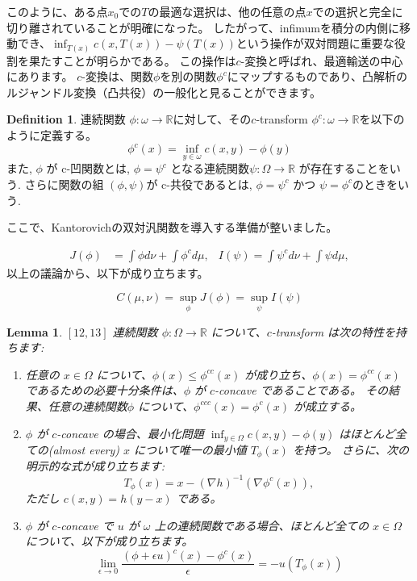 \documentclass{jsarticle}
\newtheorem{lem}[thm]{Lemma}
\theoremstyle{definition}
\newtheorem{dfn}{Definition}[section]
\begin{document}
このように、ある点$x_0$での$T$の最適な選択は、他の任意の点$x$での選択と完全に切り離されていることが明確になった。
したがって、infimumを積分の内側に移動でき、$\inf_{T(x)} c(x,T(x)) - \psi (T(x))$という操作が双対問題に重要な役割を果たすことが明らかである。
この操作は$c$-変換と呼ばれ、最適輸送の中心にあります。
$c$-変換は、関数$\phi$を別の関数$\phi^c$にマップするものであり、凸解析のルジャンドル変換（凸共役）の一般化と見ることができます。

\begin{dfn}
  連続関数 $\phi: \omega \to \mathbb{R}$に対して、その$c$-transform $\phi^c: \omega \to \mathbb{R}$を以下のように定義する。
  \begin{equation*}
    \phi^c(x) = \inf_{y \in \omega} c(x, y) - \phi(y)
  \end{equation*}
  また, $\phi$ が c-凹関数とは, $\phi = \psi^c$ となる連続関数$\psi: \Omega \to \mathbb{R}$ が存在することをいう.
  さらに関数の組 $(\phi, \psi)$が c-共役であるとは, $\phi = \psi^c$ かつ $\psi = \phi^c$のときをいう.
\end{dfn}


ここで、Kantorovichの双対汎関数を導入する準備が整いました。

\begin{align*}
  J(\phi) &= \int \phi  d \nu + \int \phi^c  d \mu, &
  I(\psi) = \int \psi^c  d \nu + \int \psi  d \mu, 
\end{align*}
以上の議論から、以下が成り立ちます。

\begin{equation*}
  C(\mu, \nu) = \sup_\phi J(\phi) = \sup_\psi I(\psi)
\end{equation*}


\begin{lem}
  $\left[ 12, 13 \right]$
  連続関数 $\phi: \Omega \to \mathbb{R}$ について、$c$-transform は次の特性を持ちます:
  \begin{enumerate}
  \item 任意の $x \in \Omega$ について、$\phi(x) \le \phi^{cc}(x)$ が成り立ち、$\phi(x) = \phi^{cc}(x)$ であるための必要十分条件は、$\phi$ が $c$-concave であることである。
  その結果、任意の連続関数$\phi$ について、$\phi^{ccc}(x) = \phi^{c}(x)$ が成立する。
  
  \item $\phi$ が $c$-concave の場合、最小化問題 $\inf_{y \in \Omega} c(x, y) - \phi(y)$ はほとんど全ての(almost every) $x$ について唯一の最小値 $T_\phi(x)$ を持つ。
  さらに、次の明示的な式が成り立ちます:
  \begin{equation*}
    T_\phi(x) = x - (\nabla h)^{-1}(\nabla \phi^c(x)),
  \end{equation*}
  ただし $c(x, y) = h(y - x)$ である。
  
  \item $\phi$ が $c$-concave で $u$ が $\omega$ 上の連続関数である場合、ほとんど全ての $x \in \Omega$ について、以下が成り立ちます。
  \begin{equation*}
    \lim_{\epsilon \to 0} \frac{(\phi + \epsilon u)^c(x) - \phi^c(x)}{\epsilon} = - u(T_\phi(x)) 
  \end{equation*}
  \end{enumerate}
\end{lem}
\end{document}
